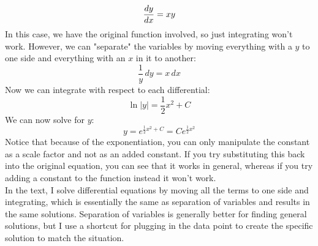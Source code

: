 \[
	\frac{d y}{d x} = xy 
\]
In this case, we have the original function involved, so just integrating won't work. However, we can "separate" the variables by moving everything with a $y$ to one side and everything with an $x$ in it to another: 
\[
	\frac{1}{y} \, dy = x \, dx
\]
Now we can integrate with respect to each differential:
\[
	\ln |y| = \frac{1}{2}x^2 + C
\]
We can now solve for $y$:
\[
	y = e^{\frac{1}{2}x^2 + C} = Ce^{\frac{1}{2}x^2}
\]
Notice that because of the exponentiation, you can only manipulate the constant as a scale factor and not as an added constant. If you try substituting this back into the original equation, you can see that it works in general, whereas if you try adding a constant to the function instead it won't work. \\
In the text, I solve differential equations by moving all the terms to one side and integrating, which is essentially the same as separation of variables and results in the same solutions. Separation of variables is generally better for finding general solutions, but I use a shortcut for plugging in the data point to create the specific solution to match the situation. 

